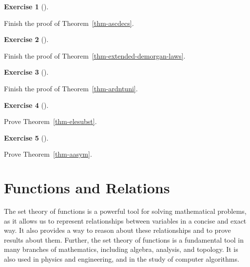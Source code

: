\documentclass[
  letterpaper,
  10pt,
  reqno,
  twopage,
  openany]{book}
\theoremstyle{plain}
\theoremstyle{definition}
\newtheorem{exercise}{Exercise}[chapter]
\theoremstyle{definition}
\theoremstyle{definition}
\theoremstyle{plain}
\theoremstyle{plain}
\theoremstyle{remark}
\begin{document}
\leavevmode{}%
\begin{exercise}[]\label{exr-ascdecs}

Finish the proof of Theorem~\ref{thm-ascdecs}.

\end{exercise}

\leavevmode{}%
\begin{exercise}[]\label{exr-extended-demorgan-laws}

Finish the proof of Theorem~\ref{thm-extended-demorgan-laws}.

\end{exercise}

\leavevmode{}%
\begin{exercise}[]\label{exr-ardntuni}

Finish the proof of Theorem~\ref{thm-ardntuni}.

\end{exercise}

\leavevmode{}%
\begin{exercise}[]\label{exr-elesubst}

Prove Theorem~\ref{thm-elesubst}.

\end{exercise}

\leavevmode{}%
\begin{exercise}[]\label{exr-aasym}

Prove Theorem~\ref{thm-aasym}.

\end{exercise}


\hypertarget{functions-and-relations}{%
\chapter{Functions and Relations}\label{functions-and-relations}}

The set theory of functions is a powerful tool for solving mathematical
problems, as it allows us to represent relationships between variables
in a concise and exact way. It also provides a way to reason about these
relationships and to prove results about them. Further, the set theory
of functions is a fundamental tool in many branches of mathematics,
including algebra, analysis, and topology. It is also used in physics
and engineering, and in the study of computer algorithms.
\end{document}
